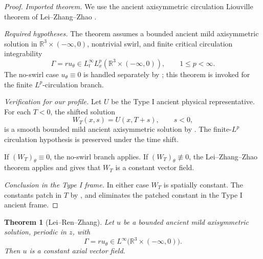 \documentclass[11pt]{amsart}
\theoremstyle{plain}
\newtheorem{theorem}{Theorem}[section]
\theoremstyle{definition}
\theoremstyle{remark}
\numberwithin{equation}{section}
\newcommand{\R}{\mathbb R}
\begin{document}
\begin{proof}
\smallskip
\noindent\emph{Imported theorem.}
We use the ancient axisymmetric circulation Liouville theorem of
Lei--Zhang--Zhao \cite[Theorem 1.3]{LZZ}.

\smallskip
\noindent\emph{Required hypotheses.}
The theorem assumes a bounded ancient mild axisymmetric solution in
\(\R^3\times(-\infty,0)\), nontrivial swirl, and finite critical circulation integrability
\[
   \Gamma=ru_\theta
   \in L_t^\infty L_x^p(\R^3\times(-\infty,0)),
   \qquad 1\le p<\infty .
\]
The no-swirl case \(u_\theta\equiv0\) is handled separately by
; this theorem is invoked for the finite
\(L^p\)-circulation branch.

\smallskip
\noindent\emph{Verification for our profile.}
Let \(U\) be the Type I ancient physical representative.  For each \(T<0\),
the shifted solution
\[
   W_T(x,s)=U(x,T+s),\qquad s<0,
\]
is a smooth bounded mild ancient axisymmetric solution by
.  The finite-\(L^p\) circulation hypothesis is
preserved under the time shift.

If \((W_T)_\theta\equiv0\), the no-swirl branch
 applies.  If
\((W_T)_\theta\not\equiv0\), the Lei--Zhang--Zhao theorem applies and gives
that \(W_T\) is a constant vector field.

\smallskip
\noindent\emph{Conclusion in the Type I frame.}
In either case \(W_T\) is spatially constant.  The constants patch in \(T\) by
, and
 eliminates the patched constant in the
Type I ancient frame.
\end{proof}

\begin{theorem}[Lei--Ren--Zhang]
\label{p3:thm:lrz}
Let \(u\) be a bounded ancient mild axisymmetric solution, periodic in \(z\),
with
\[
   \Gamma=ru_\theta\in L^\infty
   \bigl(\mathbb R^3\times(-\infty,0)\bigr).
\]
Then \(u\) is a constant axial vector field.
\end{theorem}
\end{document}
